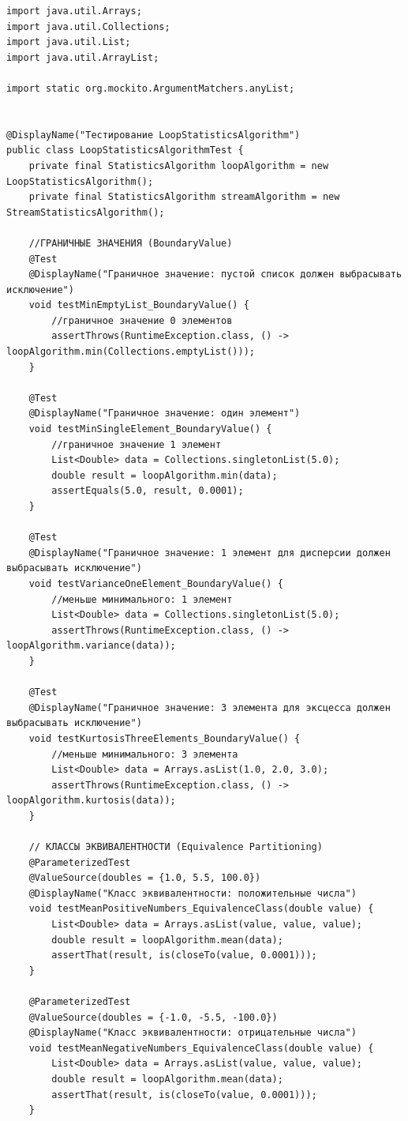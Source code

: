 \begin{verbatim}
import java.util.Arrays;
import java.util.Collections;
import java.util.List;
import java.util.ArrayList;

import static org.mockito.ArgumentMatchers.anyList;


@DisplayName("Тестирование LoopStatisticsAlgorithm")
public class LoopStatisticsAlgorithmTest {
    private final StatisticsAlgorithm loopAlgorithm = new LoopStatisticsAlgorithm();
    private final StatisticsAlgorithm streamAlgorithm = new StreamStatisticsAlgorithm();

    //ГРАНИЧНЫЕ ЗНАЧЕНИЯ (BoundaryValue)
    @Test
    @DisplayName("Граничное значение: пустой список должен выбрасывать исключение")
    void testMinEmptyList_BoundaryValue() {
        //граничное значение 0 элементов
        assertThrows(RuntimeException.class, () -> loopAlgorithm.min(Collections.emptyList()));
    }

    @Test
    @DisplayName("Граничное значение: один элемент")
    void testMinSingleElement_BoundaryValue() {
        //граничное значение 1 элемент
        List<Double> data = Collections.singletonList(5.0);
        double result = loopAlgorithm.min(data);
        assertEquals(5.0, result, 0.0001);
    }

    @Test
    @DisplayName("Граничное значение: 1 элемент для дисперсии должен выбрасывать исключение")
    void testVarianceOneElement_BoundaryValue() {
        //меньше минимального: 1 элемент
        List<Double> data = Collections.singletonList(5.0);
        assertThrows(RuntimeException.class, () -> loopAlgorithm.variance(data));
    }

    @Test
    @DisplayName("Граничное значение: 3 элемента для эксцесса должен выбрасывать исключение")
    void testKurtosisThreeElements_BoundaryValue() {
        //меньше минимального: 3 элемента
        List<Double> data = Arrays.asList(1.0, 2.0, 3.0);
        assertThrows(RuntimeException.class, () -> loopAlgorithm.kurtosis(data));
    }

    // КЛАССЫ ЭКВИВАЛЕНТНОСТИ (Equivalence Partitioning)
    @ParameterizedTest
    @ValueSource(doubles = {1.0, 5.5, 100.0})
    @DisplayName("Класс эквивалентности: положительные числа")
    void testMeanPositiveNumbers_EquivalenceClass(double value) {
        List<Double> data = Arrays.asList(value, value, value);
        double result = loopAlgorithm.mean(data);
        assertThat(result, is(closeTo(value, 0.0001)));
    }

    @ParameterizedTest
    @ValueSource(doubles = {-1.0, -5.5, -100.0})
    @DisplayName("Класс эквивалентности: отрицательные числа")
    void testMeanNegativeNumbers_EquivalenceClass(double value) {
        List<Double> data = Arrays.asList(value, value, value);
        double result = loopAlgorithm.mean(data);
        assertThat(result, is(closeTo(value, 0.0001)));
    }


\end{verbatim}
